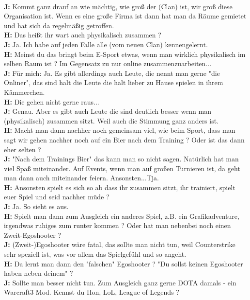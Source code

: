 \\ \textbf{J:} Kommt ganz drauf an wie mächtig, wie groß der (Clan) ist, wir groß diese Organisation ist. Wenn es eine große Firma ist dann hat man da  Räume gemietet und hat sich da regelmäßig getroffen.
\\ \textbf{H:} Das heißt ihr wart auch physikalisch zusammen ?
\\ \textbf{J:} Ja. Ich habe auf jeden Falle alle (vom neuen Clan) kennengelernt.
\\ \textbf{H:} Meinst du das bringt beim E-Sport etwas, wenn man wirklich physikalisch im selben Raum ist ? Im Gegensatz zu nur online zusammenzuarbeiten...
\\ \textbf{J:} Für mich: Ja. Es gibt allerdings auch Leute, die nennt man gerne "die Onliner", das sind halt die Leute die halt lieber zu Hause spielen in ihrem Kämmerchen.
\\ \textbf{H:} Die gehen nicht gerne raus...
\\ \textbf{J:} Genau. Aber es gibt auch Leute die sind deutlich besser wenn man (physikalisch) zusammen sitzt. Weil auch die Stimmung ganz anders ist.
\\ \textbf{H:} Macht man dann nachher noch gemeinsam viel, wie beim Sport, dass man sagt wir gehen nachher noch auf ein Bier nach dem Training ? Oder ist das dann eher selten ?
\\ \textbf{J:} "Nach dem Trainings Bier" das kann man so nicht sagen. Natürlich hat man viel Spaß miteinander. Auf Events, wenn man auf großen Turnieren ist, da geht man dann auch miteinander feiern. Ansonsten...Tja.
\\ \textbf{H:} Ansonsten spielt es sich so ab dass ihr zusammen sitzt, ihr trainiert, spielt euer Spiel und seid nachher müde ?
\\ \textbf{J:} Ja. So sieht es aus.
\\ \textbf{H:} Spielt man dann zum Ausgleich ein anderes Spiel, z.B. ein Grafikadventure, irgendwas ruhiges zum runter kommen ? Oder hat man nebenbei noch einen Zweit-Egoshooter ?
\\ \textbf{J:} (Zweit-)Egoshooter wäre fatal, das sollte man nicht tun, weil Counterstrike sehr speziell ist, was vor allem das Spielgefühl und so angeht.
\\ \textbf{H:} Da lernt man dann den "falschen" Egoshooter ? "Du sollst keinen Egoshooter haben neben deinem" ?
\\ \textbf{J:} Sollte man besser nicht tun. Zum Ausgleich ganz gerne DOTA damals - ein Warcraft3 Mod. Kennst du Hon, LoL, League of Legends ?
